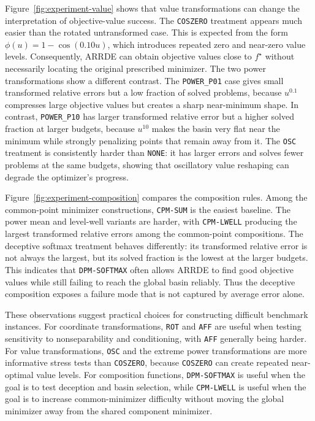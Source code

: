 \documentclass[journal]{IEEEtran}
\theoremstyle{remark}
\theoremstyle{plain}
\begin{document}
Figure~\ref{fig:experiment-value} shows that value transformations can change
the interpretation of objective-value success. The \texttt{COSZERO} treatment
appears much easier than the rotated untransformed case. This is expected from
the form \(\phi(u)=1-\cos(0.10u)\), which introduces repeated zero and
near-zero value levels. Consequently, ARRDE can obtain objective values close to
\(f^\star\) without necessarily locating the original prescribed minimizer. The
two power transformations show a different contrast. The \texttt{POWER\_P01}
case gives small transformed relative errors but a low fraction of solved
problems, because \(u^{0.1}\) compresses large objective values but creates a
sharp near-minimum shape. In contrast, \texttt{POWER\_P10} has larger
transformed relative error but a higher solved fraction at larger budgets,
because \(u^{10}\) makes the basin very flat near the minimum while strongly
penalizing points that remain away from it. The \texttt{OSC} treatment is
consistently harder than \texttt{NONE}: it has larger errors and solves fewer
problems at the same budgets, showing that oscillatory value reshaping can
degrade the optimizer's progress.

Figure~\ref{fig:experiment-composition} compares the composition rules. Among
the common-point minimizer constructions, \texttt{CPM-SUM} is the easiest
baseline. The power mean and level-well variants are harder, with
\texttt{CPM-LWELL} producing the largest transformed relative errors among the
common-point compositions. The deceptive softmax treatment behaves differently:
its transformed relative error is not always the largest, but its solved
fraction is the lowest at the larger budgets. This indicates that
\texttt{DPM-SOFTMAX} often allows ARRDE to find good objective values while
still failing to reach the global basin reliably. Thus the deceptive
composition exposes a failure mode that is not captured by average error alone.

These observations suggest practical choices for constructing difficult
benchmark instances. For coordinate transformations, \texttt{ROT} and
\texttt{AFF} are useful when testing sensitivity to nonseparability and
conditioning, with \texttt{AFF} generally being harder. For value
transformations, \texttt{OSC} and the extreme power transformations are more
informative stress tests than \texttt{COSZERO}, because \texttt{COSZERO} can
create repeated near-optimal value levels. For composition functions,
\texttt{DPM-SOFTMAX} is useful when the goal is to test deception and basin
selection, while \texttt{CPM-LWELL} is useful when the goal is to increase
common-minimizer difficulty without moving the global minimizer away from the
shared component minimizer.
\end{document}
